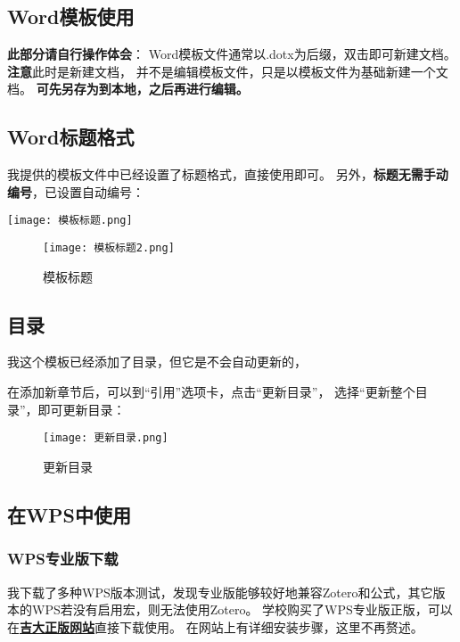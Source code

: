 \subsection{Word模板使用}
\textbf{此部分请自行操作体会}：
Word模板文件通常以.dotx为后缀，双击即可新建文档。\textbf{注意}此时是新建文档，
并不是编辑模板文件，只是以模板文件为基础新建一个文档。
\textbf{可先另存为到本地，之后再进行编辑。}

\subsection{Word标题格式}

我提供的模板文件中已经设置了标题格式，直接使用即可。
另外，\textbf{标题无需手动编号}，已设置自动编号：

\begin{figure*}[!h]
    \centering
    \texttt{[image: 模板标题.png]}
\end{figure*}
\begin{figure}[!h]
    \centering
    \texttt{[image: 模板标题2.png]}
    \caption{模板标题}
    \label{Word 2}
\end{figure}

\newpage

\subsection{目录}

我这个模板已经添加了目录，但它是不会自动更新的，

在添加新章节后，可以到“引用”选项卡，点击“更新目录”，
选择“更新整个目录”，即可更新目录：
\begin{figure}[!h]
    \centering
    \texttt{[image: 更新目录.png]}
    \caption{更新目录}
    \label{Word 3}
\end{figure}

\subsection{在WPS中使用}
\subsubsection{WPS专业版下载}
我下载了多种WPS版本测试，发现专业版能够较好地兼容Zotero和公式，其它版本的WPS若没有启用宏，则无法使用Zotero。
学校购买了WPS专业版正版，可以在\textbf{\textcolor{blue}{\href{https://zbhrj1.jlu.edu.cn/download/wpsp.html}{吉大正版网站}}}直接下载使用。
在网站上有详细安装步骤，这里不再赘述。


